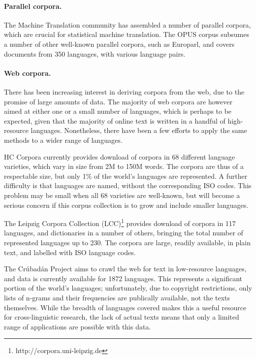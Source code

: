 
\paragraph{Parallel corpora.}

The Machine Translation community has assembled a number of parallel corpora, which are crucial for statistical machine translation. The OPUS corpus \cite{tiedemann2012opus} subsumes a number of other well-known parallel corpora, such as Europarl, and covers documents from 350 languages, with various language pairs.  


\paragraph{Web corpora.}

There has been increasing interest in deriving corpora from the web, due to the promise of large amounts of data.  The majority of web corpora are however aimed at either one or a small number of languages, which is perhaps to be expected, given that the majority of online text is written in a handful of high-resource languages.  Nonetheless, there have been a few efforts to apply the same methods to a wider range of languages.

HC Corpora currently provides download of corpora in 68 different language varieties, which vary in size from 2M to 150M words. The corpora are thus of a respectable size, but only 1\% of the world's languages are represented.  A further difficulty is that languages are named, without the corresponding ISO codes. This problem may be small when all 68 varieties are well-known, but will become a serious concern if this corpus collection is to grow and include smaller languages.

The Leipzig Corpora Collection (LCC)\footnote{http://corpora.uni-leipzig.de} \cite{biemann2007leipzig} provides download of corpora in 117 languages, and dictionaries in a number of others, bringing the total number of represented languages up to 230. The corpora are large, readily available, in plain text, and labelled with ISO language codes.

The Crúbadán Project aims to crawl the web for text in low-resource languages, and data is currently available for 1872 languages.  This represents a significant portion of the world's languages; unfortunately, due to copyright restrictions, only lists of n-grams and their frequencies are publically available, not the texts themselves.  While the breadth of languages covered makes this a useful resource for cross-linguistic research, the lack of actual texts means that only a limited range of applications are possible with this data.

